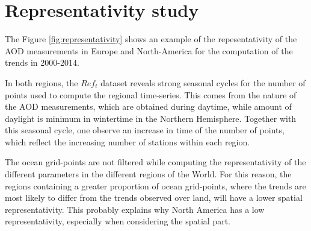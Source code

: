 \documentclass[journal abbreviation, manuscript]{copernicus}
\begin{document}








\appendix
\section{Representativity study} \label{sec:representativity} %

The Figure \ref{fig:representativity} shows an example of the repesentativity of the AOD measurements in Europe and North-America for the computation of the trends in 2000-2014.

In both regions, the $Ref_{t}$ dataset reveals strong seasonal cycles for the number of points used to compute the regional time-series. This comes from the nature of the AOD measurements, which are obtained during daytime, while amount of daylight is minimum in wintertime in the Northern Hemisphere. Together with this seasonal cycle, one observe an increase in time of the number of points, which reflect the increasing number of stations within each region.

The ocean grid-points are not filtered while computing the representativity of the different parameters in the different regions of the World. For this reason, the regions containing a greater proportion of ocean grid-points, where the trends are most likely to differ from the trends observed over land, will have a lower spatial representativity. This probably explains why North America has a low representativity, especially when considering the spatial part.

\subsection{}     %


\noappendix       %

\end{document}
